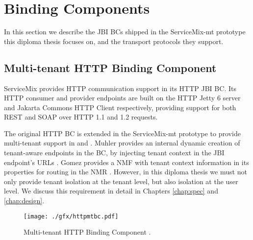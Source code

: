 \section{Binding Components}
\label{sec:bindingcomponents}  

In this section we describe the \ac{JBI} \ac{BC}s shipped in the ServiceMix-mt prototype this diploma thesis focuses on, and the transport protocols they support. 

\subsection{Multi-tenant HTTP Binding Component}

ServiceMix provides \ac{HTTP} communication support in its \ac{HTTP} \ac{JBI} \ac{BC}. Its \ac{HTTP} consumer and provider endpoints are built on the \ac{HTTP} Jetty 6 server and Jakarta Commons \ac{HTTP} Client respectively, providing support for both REST and SOAP over HTTP 1.1 and 1.2 requests.

The original \ac{HTTP} \ac{BC} is extended in the ServiceMix-mt prototype to provide multi-tenant support in \cite{Muhler2012} and \cite{gomez2012}. Muhler provides an internal dynamic creation of tenant-aware endpoints in the \ac{BC}, by injecting tenant context in the \ac{JBI} endpoint's URLs \cite{Muhler2012}. Gomez provides a \ac{NMF} with tenant context information in its properties for routing in the \ac{NMR} \cite{gomez2012}. However, in this diploma thesis we must not only provide tenant isolation at the tenant level, but also isolation at the user level. We discuss this requirement in detail in Chapters \ref{chap:spec} and \ref{chap:design}.

\begin{figure}[htb]
	\centering
		\texttt{[image: ./gfx/httpmtbc.pdf]}
	\caption[Multi-tenant HTTP Binding Component]{Multi-tenant HTTP Binding Component \cite{gomez2012}. }
	\label{fig:httpmt}
\end{figure}

